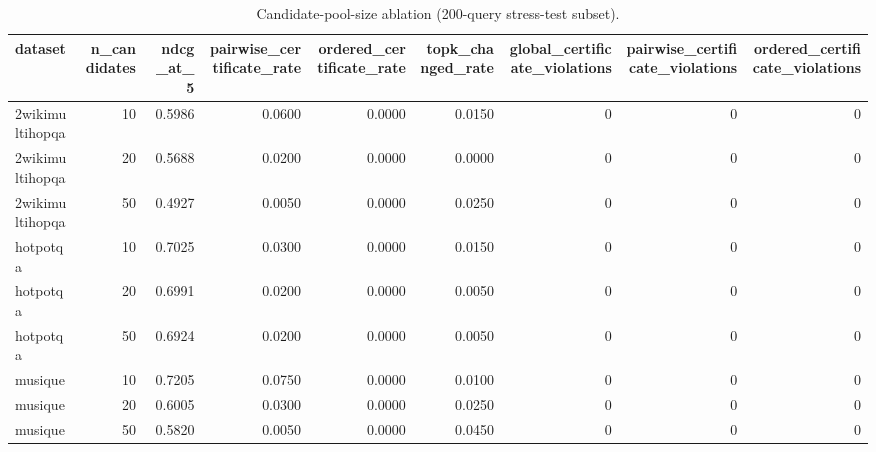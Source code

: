 \begin{table}
\caption{Candidate-pool-size ablation (200-query stress-test subset).}
\label{tab:table3_candidate_pool_ablation}
\begin{tabular}{lrrrrrrrr}
\toprule
dataset & n_candidates & ndcg_at_5 & pairwise_certificate_rate & ordered_certificate_rate & topk_changed_rate & global_certificate_violations & pairwise_certificate_violations & ordered_certificate_violations \\
\midrule
2wikimultihopqa & 10 & 0.5986 & 0.0600 & 0.0000 & 0.0150 & 0 & 0 & 0 \\
2wikimultihopqa & 20 & 0.5688 & 0.0200 & 0.0000 & 0.0000 & 0 & 0 & 0 \\
2wikimultihopqa & 50 & 0.4927 & 0.0050 & 0.0000 & 0.0250 & 0 & 0 & 0 \\
hotpotqa & 10 & 0.7025 & 0.0300 & 0.0000 & 0.0150 & 0 & 0 & 0 \\
hotpotqa & 20 & 0.6991 & 0.0200 & 0.0000 & 0.0050 & 0 & 0 & 0 \\
hotpotqa & 50 & 0.6924 & 0.0200 & 0.0000 & 0.0050 & 0 & 0 & 0 \\
musique & 10 & 0.7205 & 0.0750 & 0.0000 & 0.0100 & 0 & 0 & 0 \\
musique & 20 & 0.6005 & 0.0300 & 0.0000 & 0.0250 & 0 & 0 & 0 \\
musique & 50 & 0.5820 & 0.0050 & 0.0000 & 0.0450 & 0 & 0 & 0 \\
\bottomrule
\end{tabular}
\end{table}
